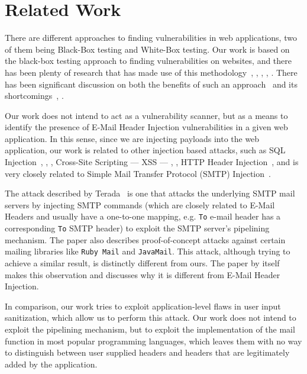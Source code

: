 \section{Related Work}

There are different approaches to finding vulnerabilities in web applications, two of them being Black-Box testing and White-Box testing.
Our work is based on the black-box testing approach to finding vulnerabilities on websites, and there has been plenty of research that has made use of this methodology~\cite{Beizer:1995:BTT:202699}, \cite{Huang}, \cite{kals2006secubat}, \cite{payet13:ears-in-the-wild}, \cite{zanero2005automatic}. There has been significant discussion on both the benefits of such an approach~\cite{black-box} and its shortcomings~\cite{Doupe2012}, \cite{Doupe2010}.

Our work does not intend to act as a vulnerability scanner, but as a means to identify the presence of E-Mail Header Injection vulnerabilities in a given web application. In this sense, since we are injecting payloads into the web application, our work is related to other injection based attacks, such as SQL Injection~\cite{sql1}, \cite{sql0}, \cite{sql2}, Cross-Site Scripting --- XSS --- \cite{Injection1}, \cite{KleinAmit}, HTTP Header Injection~\cite{sessionride}, and is very closely related to Simple Mail Transfer Protocol (SMTP) Injection~\cite{Terada2015}.

The attack described by Terada~\cite{Terada2015} is one that attacks the underlying SMTP mail servers by injecting SMTP commands (which are closely related to E-Mail Headers and usually have a one-to-one mapping, e.g. \texttt{To} e-mail header has a corresponding \texttt{To} SMTP header) to exploit the SMTP server's pipelining mechanism. The paper also describes proof-of-concept attacks against certain mailing libraries like \texttt{Ruby Mail} and \texttt{JavaMail}. This attack, although trying to achieve a similar result, is distinctly different from ours. The paper by itself makes this observation and discusses why it is different from E-Mail Header Injection.

In comparison, our work tries to exploit application-level flaws in user input sanitization, which allow us to perform this attack. Our work does not intend to exploit the pipelining mechanism, but to exploit the implementation of the mail function in most popular programming languages, which leaves them with no way to distinguish between user supplied headers and headers that are legitimately added by the application.


